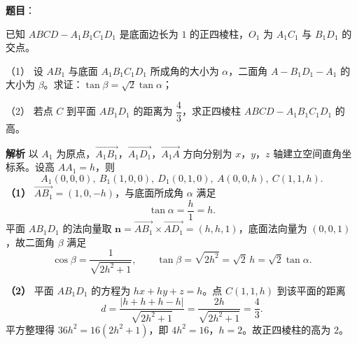 \begin{answer}

\textbf{题目}：

已知 $ABCD-A_1B_1C_1D_1$ 是底面边长为 $1$ 的正四棱柱，$O_1$ 为 $A_1C_1$ 与 $B_1D_1$ 的交点。

（1） 设 $AB_1$ 与底面 $A_1B_1C_1D_1$ 所成角的大小为 $\alpha$，二面角 $A-B_1D_1-A_1$ 的大小为 $\beta$。求证：$\tan\beta=\sqrt2\tan\alpha$；

（2） 若点 $C$ 到平面 $AB_1D_1$ 的距离为 $\dfrac43$，求正四棱柱 $ABCD-A_1B_1C_1D_1$ 的高。
\nopagebreak[4]
\begin{center}\end{center}
\nopagebreak[4]
\textbf{解析}
以 $A_1$ 为原点，$\overrightarrow{A_1B_1}$，$\overrightarrow{A_1D_1}$，$\overrightarrow{A_1A}$ 方向分别为 $x$，$y$，$z$ 轴建立空间直角坐标系。设高 $AA_1=h$，则
\nopagebreak[4]
\[A_1(0,0,0),\ B_1(1,0,0),\ D_1(0,1,0),\ A(0,0,h),\ C(1,1,h).\]
\textbf{（1）} $\overrightarrow{AB_1}=(1,0,-h)$，与底面所成角 $\alpha$ 满足
\nopagebreak[4]
\[\tan\alpha=\frac{h}{1}=h.\]
平面 $AB_1D_1$ 的法向量取 $\boldsymbol n=\overrightarrow{AB_1}\times\overrightarrow{AD_1}=(h,h,1)$，底面法向量为 $(0,0,1)$，故二面角 $\beta$ 满足
\nopagebreak[4]
\[\cos\beta=\frac{1}{\sqrt{2h^2+1}},\qquad \tan\beta=\sqrt{2h^2}=\sqrt2\,h=\sqrt2\tan\alpha.\]

\textbf{（2）} 平面 $AB_1D_1$ 的方程为 $hx+hy+z=h$。点 $C(1,1,h)$ 到该平面的距离
\nopagebreak[4]
\[d=\frac{|h+h+h-h|}{\sqrt{2h^2+1}}=\frac{2h}{\sqrt{2h^2+1}}=\frac43.\]
平方整理得 $36h^2=16(2h^2+1)$，即 $4h^2=16$，$h=2$。故正四棱柱的高为 $2$。



\end{answer}
